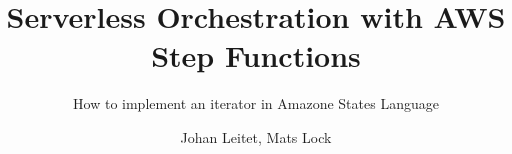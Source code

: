 \title{Serverless Orchestration with AWS Step Functions}
\subtitle{How to implement an iterator in Amazone States Language}
\author{Johan Leitet, Mats Lock}
\subject{Computer Science}
